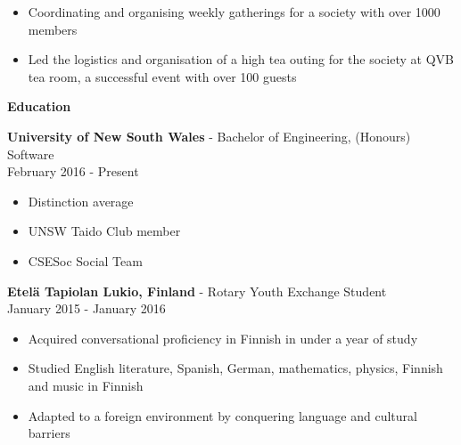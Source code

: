 \documentclass{article}
\newcommand{\minititle}[1]{\begin{center}\textbf{#1} \end{center} \vspace{0.2cm}}
\newcommand{\resumeEntry}[3]{{\large \textbf{#1} - #2} \\ \small{#3}}
\begin{document}
\begin{minipage}[t]{0.6\linewidth}
{\begin{itemize}
            \setlength\itemsep{0.05cm}
            \item Coordinating and organising weekly gatherings for a society with over 1000 members 
            \item Led the logistics and organisation of a high tea outing for the society at QVB tea room, a successful event with over 100 guests
        \end{itemize}
    }
    {
        \vspace{0.1cm}
        \minititle{Education}
        \resumeEntry{University of New South Wales}{Bachelor of Engineering, (Honours) Software}{February 2016 - Present}
        \begin{itemize}
            \setlength\itemsep{0.05cm}
            \item Distinction average
            \item UNSW Taido Club member
            \item CSESoc Social Team
        \end{itemize}
        \vspace{0.4cm}
        \resumeEntry{Etel{\"a} Tapiolan Lukio, Finland}{Rotary Youth Exchange Student}{January 2015 - January 2016}
        \begin{itemize}
            \setlength\itemsep{0.05cm}
            \item Acquired conversational proficiency in Finnish in under a year of study
            \item Studied English literature, Spanish, German, mathematics, physics, Finnish and music in Finnish
            \item Adapted to a foreign environment by conquering language and cultural barriers

        \end{itemize}
    }
\end{minipage}\hspace{1cm}
\end{document}
